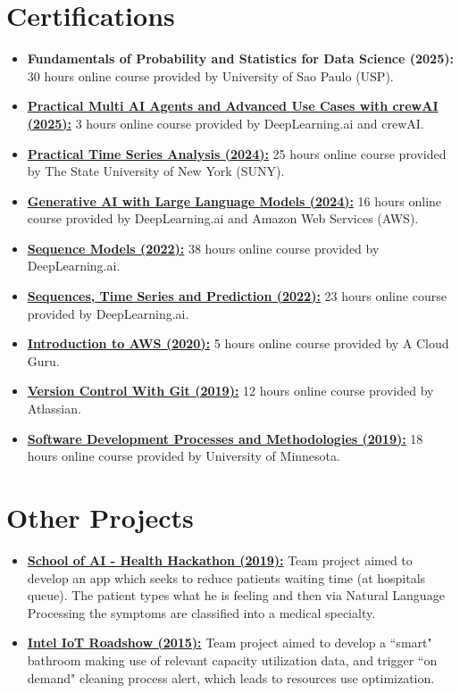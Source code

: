 \documentclass[letterpaper,6pt]{article}
\newcommand{\resumeItem}[2]{
  \item\small{
    \textbf{#1}{ #2 \vspace{-2pt}}
  }
}
\newcommand{\resumeSubItem}[2]{\resumeItem{#1}{#2}\vspace{-4pt}}
\newcommand{\resumeSubHeadingListStart}{\begin{itemize}[leftmargin=*]}
\newcommand{\resumeSubHeadingListEnd}{\end{itemize}}
\begin{document}
\section{Certifications}
  \resumeSubHeadingListStart
    \resumeItem{Fundamentals of Probability and Statistics for Data Science (2025):}{30 hours online course provided by University of Sao Paulo (USP).}
    \resumeItem{\href{https://learn.deeplearning.ai/accomplishments/3db9d146-093c-4dea-bb10-35f1f4fcf390?usp=sharing}{Practical Multi AI Agents and Advanced Use Cases with crewAI (2025):}}{3 hours online course provided by DeepLearning.ai and crewAI.}
    \resumeItem{\href{https://coursera.org/share/236b7e6ee1cd2fe7d370d22032c9829b}{Practical Time Series Analysis (2024):}}{25 hours online course provided by The State University of New York (SUNY).}
    \resumeItem{\href{https://coursera.org/share/2c0b8bc9c80337baff021341eb7291f6}{Generative AI with Large Language Models (2024):}}{16 hours online course provided by DeepLearning.ai and Amazon Web Services (AWS).}
    \resumeItem{\href{https://coursera.org/share/bfeeaa2fdb5d0af4a6ae16bbea2308a5}{Sequence Models (2022):}}{38 hours online course provided by DeepLearning.ai.}
    \resumeItem{\href{https://coursera.org/share/26abd334d3e6eeb10cdef24a925c1a06}{Sequences, Time Series and Prediction (2022):}}{23 hours online course provided by DeepLearning.ai.}
    \resumeItem{\href{https://verify.acloud.guru/40ACAB21F4F9}{Introduction to AWS (2020):}}{5 hours online course provided by A Cloud Guru.}
    \resumeItem{\href{https://coursera.org/share/0f7a200acafda161712761aabc647fdf}{Version Control With Git (2019):}}{12 hours online course provided by Atlassian.}
    \resumeItem{\href{https://coursera.org/share/49e36f73ee5af2e58a65943a26848b88}{Software Development Processes and Methodologies (2019):}}{18 hours online course provided by University of Minnesota.}
  \resumeSubHeadingListEnd

\section{Other Projects}
  \resumeSubHeadingListStart
    \resumeSubItem{\href{https://github.com/bzamith/ID_Agile-HH}{School of AI - Health Hackathon (2019):}}{Team project aimed to develop an app which seeks to reduce patients waiting time (at hospitals queue). The patient types what he is feeling and then via Natural Language Processing the symptoms are classified into a medical specialty. }
    \resumeSubItem{\href{http://www.instructables.com/id/IoT-Smart-Bathroom/}{Intel IoT Roadshow (2015):}}{Team project aimed to develop a ``smart" bathroom making use of relevant capacity utilization data, and trigger ``on demand" cleaning process alert, which leads to resources use optimization.}
  \resumeSubHeadingListEnd
\end{document}
